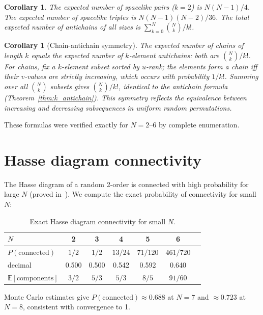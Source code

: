 \documentclass[aps,prd,twocolumn,superscriptaddress,nofootinbib]{revtex4-2}
\newtheorem{corollary}[theorem]{Corollary}
\begin{document}
\begin{corollary}
\label{cor:spacelike}
The expected number of spacelike pairs ($k = 2$) is $N(N-1)/4$. The expected number of spacelike triples is $N(N-1)(N-2)/36$. The total expected number of antichains of all sizes is $\sum_{k=0}^{N} \binom{N}{k}/k!$.
\end{corollary}

\begin{corollary}[Chain-antichain symmetry]
\label{cor:chain_antichain}
The expected number of chains of length $k$ equals the expected number of $k$-element antichains: both are $\binom{N}{k}/k!$. For chains, fix a $k$-element subset sorted by $u$-rank; the elements form a chain iff their $v$-values are strictly increasing, which occurs with probability $1/k!$. Summing over all $\binom{N}{k}$ subsets gives $\binom{N}{k}/k!$, identical to the antichain formula (Theorem~\ref{thm:k_antichain}). This symmetry reflects the equivalence between increasing and decreasing subsequences in uniform random permutations.
\end{corollary}

These formulas were verified exactly for $N = 2$--$6$ by complete enumeration.

\section{Hasse diagram connectivity}

The Hasse diagram of a random 2-order is connected with high probability for large $N$ (proved in~\cite{brightwell1991}). We compute the exact probability of connectivity for small $N$:

\begin{table}[h]
\centering
\begin{tabular}{lcccccc}
\toprule
$N$ & 2 & 3 & 4 & 5 & 6 \\
\midrule
$P(\text{connected})$ & $1/2$ & $1/2$ & $13/24$ & $71/120$ & $461/720$ \\
decimal & 0.500 & 0.500 & 0.542 & 0.592 & 0.640 \\
$\mathbb{E}[\text{components}]$ & $3/2$ & $5/3$ & $5/3$ & $8/5$ & $91/60$ \\
\bottomrule
\end{tabular}
\caption{Exact Hasse diagram connectivity for small $N$.}
\label{tab:connectivity}
\end{table}

Monte Carlo estimates give $P(\text{connected}) \approx 0.688$ at $N = 7$ and $\approx 0.723$ at $N = 8$, consistent with convergence to 1.
\end{document}
